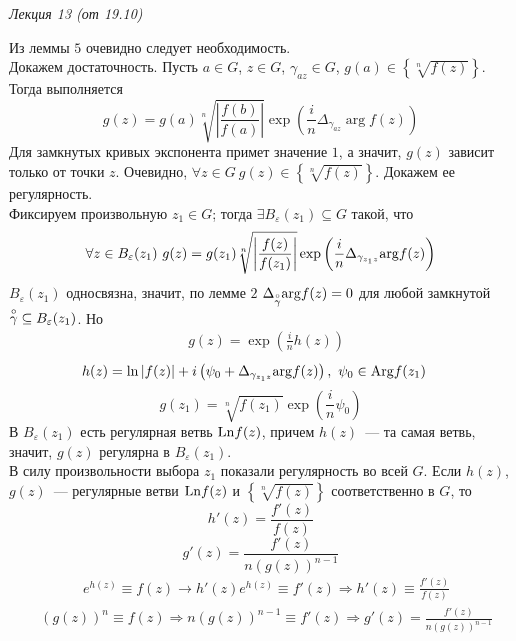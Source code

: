 \begin{flushright}
    \textit{Лекция 13 (от 19.10)}
\end{flushright}
\pr
Из леммы $5$ очевидно следует необходимость.
\\
Докажем достаточность. Пусть $a \in G$, $z \in G$, $\gamma_{az}\in G$, $g(a) \in
\left\{ \sqrt[n]{f(z)} \right\}$. Тогда выполняется
\begin{equation}\label{(16.16)}
    g(z) = g(a) \sqrt[n]{\left| \frac{f(b)}{f(a)} \right|}\exp \left( \frac{i}{n} \Delta_{\gamma_{az}}\arg f(z) \right)
\end{equation}
Для замкнутых кривых экспонента примет значение $1$, а значит, $g(z)$ зависит
только от точки $z$. Очевидно, $\forall z \in G \ g(z)\in \left\{ \sqrt[n]{f(z)}
\right\}$. Докажем ее регулярность.
\\
Фиксируем произвольную $z_1 \in G$; тогда $\exists B_\varepsilon(z_1) \subseteq G$
такой, что
\begin{equation}\label{(16.17)}
    \forall z \in B_\varepsilon(z_1) \ g(z) = g(z_1) \sqrt[n]{\left| \frac{f(z)}{f(z_1)} \right|}\exp \left( \frac{i}{n} \Delta_{\gamma_{z_1z}}\mathrm{arg} f(z) \right)
\end{equation}
$B_{\varepsilon}(z_1)$ односвязна, значит, по лемме $2$
$\Delta_{\overset{\circ}{\gamma}}\mathrm{arg} f(z) = 0$ для любой замкнутой
$\overset{\circ}{\gamma} \subseteq B_\varepsilon(z_1)$. Но
\begin{align*}
  & g(z) = \exp \left( \frac{i}{n} h(z) \right)
\end{align*}
\begin{align*}
  & h(z) = \ln \left| f(z) \right| + i \left(\psi_0 + \Delta_{\gamma_{z_1z}}\mathrm{arg} f(z)\right), \ \psi_0 \in \mathrm{Arg} f(z_1)
\end{align*}
\begin{equation}\label{(16.18)}
    g(z_1) = \sqrt[n]{f(z_1)} \exp\left( \frac{i}{n}\psi_0 \right)
\end{equation}
В $B_\varepsilon(z_1)$ есть регулярная ветвь $\mathrm{Ln} f(z)$, причем $h(z)$~--- та
самая ветвь, значит, $g(z)$ регулярна в $B_\varepsilon(z_1)$.
\\
В силу произвольности выбора $z_1$ показали регулярность во всей $G$.
\corollary
Если $h(z)$, $g(z)$~--- регулярные ветви $\mathrm{Ln} f(z)$ и $\left\{ \sqrt[n]{f(z)}
\right\}$ соответственно в $G$, то
\begin{equation}\label{(16.19)}
    h'(z) = \frac{f'(z)}{f(z)}
\end{equation}
\begin{equation}\label{(16.20)}
    g'(z) = \frac{f'(z)}{n\left( g(z) \right)^{n-1}}
\end{equation}
\pr
\begin{align*}
  & e^{h(z)} \equiv f(z) \rightarrow h'(z)e^{h(z)} \equiv f'(z) \Rightarrow h'(z) \equiv \frac{f'(z)}{f(z)}
\end{align*}
\begin{align*}
  & (g(z))^n \equiv f(z) \Rightarrow n(g(z))^{n-1} \equiv f'(z) \Rightarrow g'(z) = \frac{f'(z)}{n\left( g(z) \right)^{n-1}}
\end{align*}
